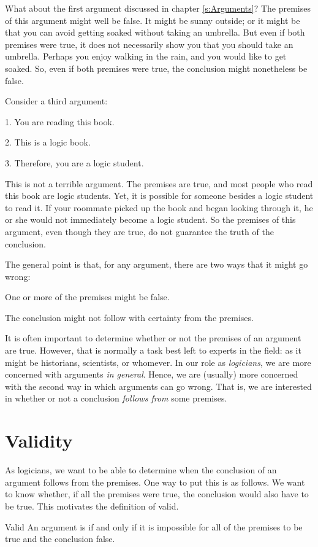 What about the first argument discussed in chapter \ref{s:Arguments}? The premises of this argument might well be false. It might be sunny outside; or it might be that you can avoid getting soaked without taking an umbrella. But even if both premises were true, it does not necessarily show you that you should take an umbrella. Perhaps you enjoy walking in the rain, and you would like to get soaked. So, even if both premises were true, the conclusion might nonetheless be false.

Consider a third argument:
	\begin{earg}
		\item[1.] You are reading this book.
		\item[2.] This is a logic book.
		\item[3.] Therefore, you are a logic student.
	\end{earg}
This is not a terrible argument. The premises are true, and most people who read this book are logic students. Yet, it is possible for someone besides a logic student to read it. If your roommate picked up the book and began looking through it, he or she would not immediately become a logic student. So the premises of this argument, even though they are true, do not guarantee the truth of the conclusion.


The general point is that, for any argument, there are two ways that it might go wrong:
	\begin{ebullet}
		\item One or more of the premises might be false. 
		\item The conclusion might not follow with certainty from the premises.
	\end{ebullet}
It is often important to determine whether or not the premises of an argument are true. However, that is normally a task best left to experts in the field: as it might be historians, scientists, or whomever. In our role as \emph{logicians}, we are more concerned with arguments \emph{in general}. Hence, we are (usually) more concerned with the second way in which arguments can go wrong. That is, we are interested in whether or not a conclusion \emph{follows from} some premises. 


\section{Validity}\label{s:Valid-def}

As logicians, we want to be able to determine when the conclusion of an argument follows from the premises. One way to put this is as follows. We want to know whether, if all the premises were true, the conclusion would also have to be true. This motivates the definition of valid.
\begin{factboxy}{Valid}
An argument is  if and only if it is impossible for all of the premises to be true and the conclusion false.
\end{factboxy}

